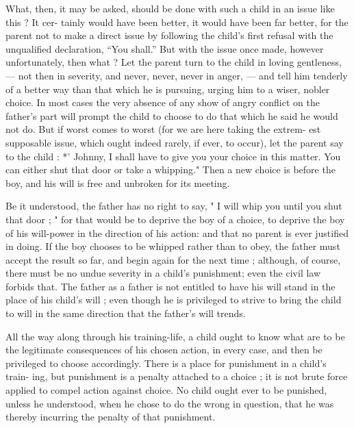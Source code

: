 \documentclass[
]{book}
\begin{document}
What, then, it may be asked, should be done with such a child in an issue like this ? It cer- tainly would have been better, it would have been far better, for the parent not to make a direct issue by following the child's first refusal with the unqualified declaration, ``You shall.'' But with the issue once made, however unfortunately, then what ? Let the parent turn to the child in loving gentleness, --- not then in severity, and never, never, never in anger, --- and tell him tenderly of a better way than that which he is pursuing, urging him to a wiser, nobler choice. In most cases the very absence of any show of angry conflict on the father's part will prompt the child to choose to do that which he said he would not do. But if worst comes to worst (for we are here taking the extrem- est supposable issue, which ought indeed rarely, if ever, to occur), let the parent say to the child : *' Johnny, I shall have to give you your choice in this matter. You can either shut that door or take a whipping." Then a new choice is before the boy, and his will is free and unbroken for its meeting.

Be it understood, the father has no right to say, " I will whip you until you shut that door ; " for that would be to deprive the boy of a choice, to deprive the boy of his will-power in the direction of his action: and that no parent is ever justified in doing. If the boy chooses to be whipped rather than to obey, the father must accept the result so far, and begin again for the next time ; although, of course, there must be no undue severity in a child's punishment; even the civil law forbids that. The father as a father is not entitled to have his will stand in the place of his child's will ; even though he is privileged to strive to bring the child to will in the same direction that the father's will trends.

All the way along through his training-life, a child ought to know what are to be the legitimate consequences of his chosen action, in every case, and then be privileged to choose accordingly. There is a place for punishment in a child's train- ing, but punishment is a penalty attached to a choice ; it is not brute force applied to compel action against choice. No child ought ever to be punished, unless he understood, when he chose to do the wrong in question, that he was thereby incurring the penalty of that punishment.
\end{document}
